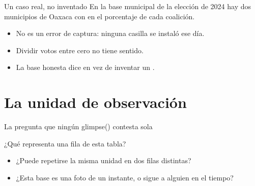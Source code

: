\begin{frame}{Un caso real, no inventado}
  \vspace{0.3em}
  En la base municipal de la elección de 2024 hay dos municipios de Oaxaca
  con  en el porcentaje de cada coalición.

  \vspace{1.0em}
  \begin{itemize}\setlength{\itemsep}{0.85em}
    \item<1-> No es un error de captura: ninguna casilla se instaló ese día.
    \item<2-> Dividir votos entre cero no tiene sentido.
    \item<3-> La base honesta dice  en vez de inventar un .
  \end{itemize}
\end{frame}

\section{La unidad de observación}

\begin{frame}{La pregunta que ningún glimpse() contesta sola}
  \vspace{0.4em}
  \begin{center}
    {\Large\color{verdeProfundo}¿Qué representa una fila de esta tabla?}
  \end{center}

  \vspace{1.3em}
  \begin{itemize}\setlength{\itemsep}{0.9em}
    \item<1-> ¿Puede repetirse la misma unidad en dos filas distintas?
    \item<2-> ¿Esta base es una foto de un instante, o sigue a alguien en el tiempo?
  \end{itemize}
\end{frame}

